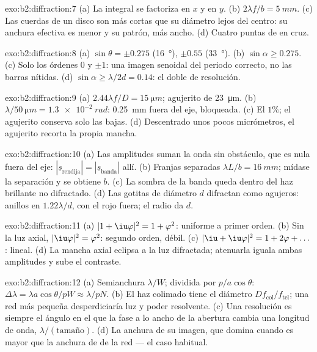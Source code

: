 \begin{solution}{exo:b2:diffraction:7}
(a) La integral se factoriza en $x$ y en $y$. (b) $2\lambda f/b = \qty{5}{mm}$. (c) Las
cuerdas de un disco son más cortas que su diámetro lejos del centro: su
anchura efectiva es menor y su patrón, más ancho. (d) Cuatro puntas de
 en cruz.
\end{solution}

\begin{solution}{exo:b2:diffraction:8}
(a) $\sin\theta = \pm0.275$ (\qty{16}{\degree}), $\pm0.55$ (\qty{33}{\degree}). (b) $\sin\alpha \ge 0.275$.
(c) Solo los órdenes $0$ y $\pm1$: una imagen senoidal del periodo correcto, no
las barras nítidas. (d) $\sin\alpha \ge \lambda/2d = 0.14$: el doble de resolución.
\end{solution}

\begin{solution}{exo:b2:diffraction:9}
(a) $2.44\lambda f/D = \qty{15}{\micro m}$; agujerito de \qty{23}{\micro m}. (b) $\lambda/\qty{50}{\micro m} =
\qty{1.3e-2}{rad}$: \qty{0.25}{mm} fuera del eje, bloqueada. (c) El $1\%$; el agujerito conserva solo
las  bajas. (d) Descentrado unos pocos micrómetros, el
agujerito recorta la propia mancha.
\end{solution}

\begin{solution}{exo:b2:diffraction:10}
(a) Las amplitudes suman la onda sin obstáculo, que es nula fuera del eje:
$|\underline s_{\text{rendija}}| = |\underline s_{\text{banda}}|$ allí. (b) Franjas separadas $\lambda L/b =
\qty{16}{mm}$; mídase la separación y se obtiene $b$. (c) La sombra de la banda queda
dentro del haz brillante no difractado. (d) Las gotitas de diámetro $d$ difractan
como agujeros: anillos en $1.22\lambda/d$, con el rojo fuera; el radio da $d$.
\end{solution}

\begin{solution}{exo:b2:diffraction:11}
(a) $|1 + \iu\varphi|^2 = 1 + \varphi^2$: uniforme a primer orden. (b) Sin la
luz axial, $|\iu\varphi|^2 = \varphi^2$: segundo orden, débil. (c) $|\iu + \iu\varphi|^2 =
1 + 2\varphi + \dots$: lineal. (d) La mancha axial eclipsa a la luz
difractada; atenuarla iguala ambas amplitudes y sube el contraste.
\end{solution}

\begin{solution}{exo:b2:diffraction:12}
(a) Semianchura $\lambda/W$; dividida por $p/a\cos\theta$: $\Delta\lambda = \lambda a\cos\theta/pW \approx
\lambda/pN$. (b) El haz colimado tiene el diámetro $Df_{\text{col}}/f_{\text{tel}}$;
una red más pequeña desperdiciaría luz y poder resolvente. (c) Una
resolución es siempre el ángulo en el que la fase a lo ancho de la
abertura cambia una longitud de onda, $\lambda/(\text{tamaño})$. (d) La anchura de su
imagen, que domina cuando es mayor que la anchura de  de la
red --- el caso habitual.
\end{solution}

